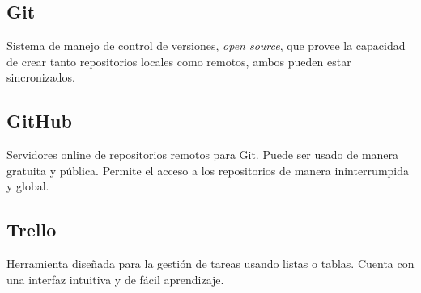         \subsection{Git}
        
        Sistema de manejo de control de versiones, \textit{open source}, que provee la capacidad de crear tanto repositorios locales como remotos, ambos pueden estar sincronizados.
        
        \subsection{GitHub}
        
        Servidores online de repositorios remotos para Git. Puede ser usado de manera gratuita y pública. Permite el acceso a los repositorios de manera ininterrumpida y global.
        
        \subsection{Trello}
        
        Herramienta diseñada para la gestión de tareas usando listas o tablas. Cuenta con una interfaz intuitiva y de fácil aprendizaje.
        
        
        
    
\pagebreak